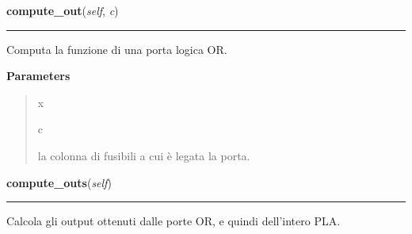     \vspace{0.5ex}

\hspace{.8\funcindent}\begin{boxedminipage}{\funcwidth}

    \raggedright \textbf{compute\_out}(\textit{self}, \textit{c})

    \vspace{-1.5ex}

    \rule{\textwidth}{0.5\fboxrule}
\setlength{\parskip}{2ex}
    Computa la funzione di una porta logica OR.

\setlength{\parskip}{1ex}
      \textbf{Parameters}
      \vspace{-1ex}

      \begin{quote}
        \begin{Ventry}{x}

          \item[c]

          la colonna di fusibili a cui è legata la porta.

        \end{Ventry}

      \end{quote}

    \end{boxedminipage}

    \label{pla:Pla:compute_outs}

    \vspace{0.5ex}

\hspace{.8\funcindent}\begin{boxedminipage}{\funcwidth}

    \raggedright \textbf{compute\_outs}(\textit{self})

    \vspace{-1.5ex}

    \rule{\textwidth}{0.5\fboxrule}
\setlength{\parskip}{2ex}
    Calcola gli output ottenuti dalle porte OR, e quindi dell'intero PLA.

\setlength{\parskip}{1ex}
    \end{boxedminipage}

    \label{pla:Pla:run}

    \vspace{0.5ex}

